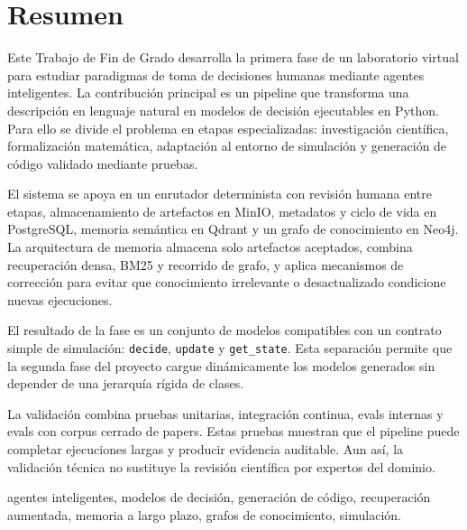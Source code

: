 \pagestyle{plain}
\chapter*{Resumen}

Este Trabajo de Fin de Grado desarrolla la primera fase de un laboratorio
virtual para estudiar paradigmas de toma de decisiones humanas mediante agentes
inteligentes. La contribución principal es un pipeline que transforma una
descripción en lenguaje natural en modelos de decisión ejecutables en Python.
Para ello se divide el problema en etapas especializadas: investigación
científica, formalización matemática, adaptación al entorno de simulación y
generación de código validado mediante pruebas.

El sistema se apoya en un enrutador determinista con revisión humana entre
etapas, almacenamiento de artefactos en MinIO, metadatos y ciclo de vida en
PostgreSQL, memoria semántica en Qdrant y un grafo de conocimiento en Neo4j. La
arquitectura de memoria almacena solo artefactos aceptados, combina recuperación
densa, BM25 y recorrido de grafo, y aplica mecanismos de corrección para evitar
que conocimiento irrelevante o desactualizado condicione nuevas ejecuciones.

El resultado de la fase es un conjunto de modelos compatibles con un contrato
simple de simulación: \texttt{decide}, \texttt{update} y \texttt{get\_state}.
Esta separación permite que la segunda fase del proyecto cargue dinámicamente
los modelos generados sin depender de una jerarquía rígida de clases.

La validación combina pruebas unitarias, integración continua, evals internas y
evals con corpus cerrado de papers. Estas pruebas muestran que el pipeline
puede completar ejecuciones largas y producir evidencia auditable. Aun así, la
validación técnica no sustituye la revisión científica por expertos del dominio.

\vspace{0.5cm}
 agentes inteligentes, modelos de decisión,
generación de código, recuperación aumentada, memoria a largo plazo, grafos de
conocimiento, simulación.
